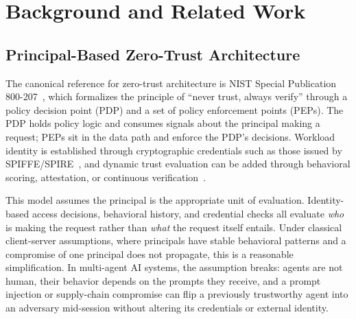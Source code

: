 \documentclass[sigconf,nonacm]{acmart}
\begin{document}

\section{Background and Related Work}
\label{sec:related}


\subsection{Principal-Based Zero-Trust Architecture}

The canonical reference for zero-trust architecture is NIST Special Publication 800-207~\cite{REF:nist-zta}, which formalizes the principle of ``never trust, always verify'' through a policy decision point (PDP) and a set of policy enforcement points (PEPs). The PDP holds policy logic and consumes signals about the principal making a request; PEPs sit in the data path and enforce the PDP's decisions. Workload identity is established through cryptographic credentials such as those issued by SPIFFE/SPIRE~\cite{REF:spiffe}, and dynamic trust evaluation can be added through behavioral scoring, attestation, or continuous verification~\cite{REF:trust-scoring-survey}.


This model assumes the principal is the appropriate unit of evaluation. Identity-based access decisions, behavioral history, and credential checks all evaluate \emph{who} is making the request rather than \emph{what} the request itself entails. Under classical client-server assumptions, where principals have stable behavioral patterns and a compromise of one principal does not propagate, this is a reasonable simplification. In multi-agent AI systems, the assumption breaks: agents are not human, their behavior depends on the prompts they receive, and a prompt injection or supply-chain compromise can flip a previously trustworthy agent into an adversary mid-session without altering its credentials or external identity.
\end{document}

